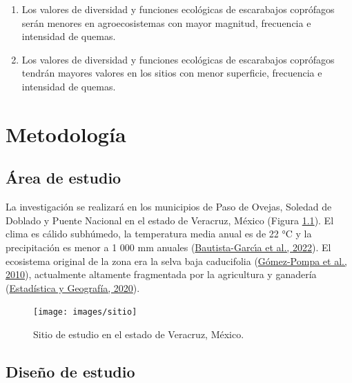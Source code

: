 \documentclass[
  11pt,
  a4paper]{book}
\begin{document}
\begin{enumerate}
\def\labelenumi{\roman{enumi}.}
\item
  Los valores de diversidad y funciones ecológicas de escarabajos coprófagos serán menores en agroecosistemas con mayor magnitud, frecuencia e intensidad de quemas.
\item
  Los valores de diversidad y funciones ecológicas de escarabajos coprófagos tendrán mayores valores en los sitios con menor superficie, frecuencia e intensidad de quemas.
\end{enumerate}

\hypertarget{metodologuxeda}{%
\chapter{Metodología}\label{metodologuxeda}}

\hypertarget{uxe1rea-de-estudio}{%
\section{Área de estudio}\label{uxe1rea-de-estudio}}

La investigación se realizará en los municipios de Paso de Ovejas, Soledad de Doblado y Puente Nacional en el estado de Veracruz, México (Figura \ref{fig:sitio}). El clima es cálido subhúmedo, la temperatura media anual es de 22 °C y la precipitación es menor a 1 000 mm anuales (\protect\hyperlink{ref-bautista2022estudio}{Bautista-Garcı́a et al., 2022}). El ecosistema original de la zona era la selva baja caducifolia (\protect\hyperlink{ref-gomez2010atlas}{Gómez-Pompa et al., 2010}), actualmente altamente fragmentada por la agricultura y ganadería (\protect\hyperlink{ref-inegi2020}{Estadística y Geografía, 2020}).

\begin{figure}

{\centering \texttt{[image: images/sitio]} 

}

\caption{Sitio de estudio en el estado de Veracruz, México.}\label{fig:sitio}
\end{figure}

\hypertarget{diseuxf1o-de-estudio}{%
\section{Diseño de estudio}\label{diseuxf1o-de-estudio}}
\end{document}
